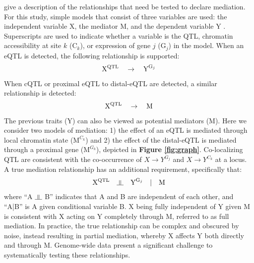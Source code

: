 \cite{Baron1986} give a description of the relationships that need be tested to declare mediation. For this study, simple models that consist of three variables are used: the independent variable X, the mediator M, and the dependent variable Y \citep{MacKinnon2007}. Superscripts are used to indicate whether a variable is the QTL, chromatin accessibility at site $k$ ($\text{C}_{k}$), or expression of gene $j$ ($\text{G}_{j}$) in the model. When an eQTL is detected, the following relationship is supported:
\begin{equation}
\text{X}\textsuperscript{QTL} \quad \rightarrow \quad \text{Y}^{\text{G}_{j}}
\label{rel:eQTL}
\end{equation}
When cQTL or proximal eQTL to distal-eQTL are detected, a similar relationship is detected:
\begin{equation}
\text{X}\textsuperscript{QTL} \quad \rightarrow \quad \text{M}
\label{rel:cQTL}
\end{equation}
The previous traits (Y) can also be viewed as potential mediators (M). Here we consider two models of mediation: 1) the effect of an eQTL is mediated through local chromatin state ($\text{M}^{C_{k}}$) and 2) the effect of the distal-eQTL is mediated through a proximal gene ($\text{M}^{G_{k}}$), depicted in \textbf{Figure \ref{fig:graph}}. Co-localizing QTL are consistent with the co-occurrence of $X \rightarrow Y^{G_{j}}$ and $X \rightarrow Y^{C_{k}}$ at a locus. A true mediation relationship has an additional requirement, specifically that: 
\begin{equation}
\text{X}\textsuperscript{QTL} \quad \indep \quad \text{Y}^{\text{G}_{j}} \quad | \quad \text{M}
\label{rel:full_mediator}
\end{equation}
where ``A $\indep$ B'' indicates that A and B are independent of each other, and ``A|B'' is A given conditional variable B. X being fully independent of Y given M is consistent with X acting on Y completely through M, referred to as full mediation. In practice, the true relationship can be complex and obscured by noise, instead resulting in partial mediation, whereby X affects Y both directly and through M. Genome-wide data present a significant challenge to systematically testing these relationships.

